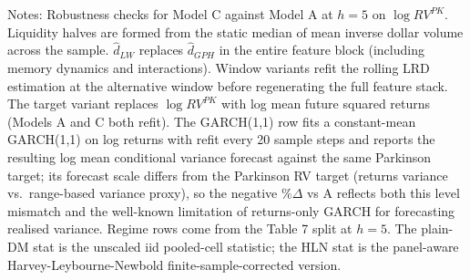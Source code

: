 
\begin{table}[htbp]
\centering
\caption{Robustness Summary: Model C vs Model A, $h=5$}
\label{tab:robustness}
\small
{}
\begin{tablenotes}\small
\item Notes: Robustness checks for Model C against Model A at $h=5$ on $\log RV^{PK}$. Liquidity halves are formed from the static median of mean inverse dollar volume across the sample. $\hat d_{LW}$ replaces $\hat d_{GPH}$ in the entire feature block (including memory dynamics and interactions). Window variants refit the rolling LRD estimation at the alternative window before regenerating the full feature stack. The target variant replaces $\log RV^{PK}$ with log mean future squared returns (Models A and C both refit). The GARCH(1,1) row fits a constant-mean GARCH(1,1) on log returns with refit every 20 sample steps and reports the resulting log mean conditional variance forecast against the same Parkinson target; its forecast scale differs from the Parkinson RV target (returns variance vs.\ range-based variance proxy), so the negative $\%\Delta$ vs A reflects both this level mismatch and the well-known limitation of returns-only GARCH for forecasting realised variance. Regime rows come from the Table 7 split at $h=5$. The plain-DM stat is the unscaled iid pooled-cell statistic; the HLN stat is the panel-aware Harvey-Leybourne-Newbold finite-sample-corrected version.
\end{tablenotes}
\end{table}
